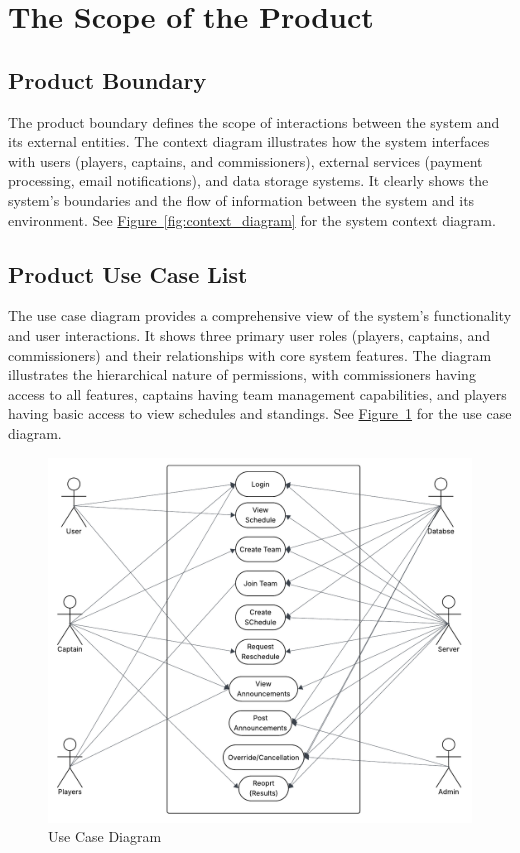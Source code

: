 \documentclass[12pt, titlepage]{article}
\begin{document}
\section{The Scope of the Product}
\subsection{Product Boundary}
The product boundary defines the scope of interactions between the system and its external entities. The context diagram illustrates how the system interfaces with users (players, captains, and commissioners), external services (payment processing, email notifications), and data storage systems. It clearly shows the system's boundaries and the flow of information between the system and its environment. See \hyperref[fig:context_diagram]{Figure~\ref{fig:context_diagram}} for the system context diagram.

\subsection{Product Use Case List}
The use case diagram provides a comprehensive view of the system's functionality and user interactions. It shows three primary user roles (players, captains, and commissioners) and their relationships with core system features. The diagram illustrates the hierarchical nature of permissions, with commissioners having access to all features, captains having team management capabilities, and players having basic access to view schedules and standings. See \hyperref[fig:use_case]{Figure~\ref{fig:use_case}} for the use case diagram.

\begin{figure}[H]
    \centering
    \includegraphics[width=\linewidth]{use_case_diagram.pdf}
    \caption{Use Case Diagram}
    \label{fig:use_case}
\end{figure}
\pagebreak
\end{document}
